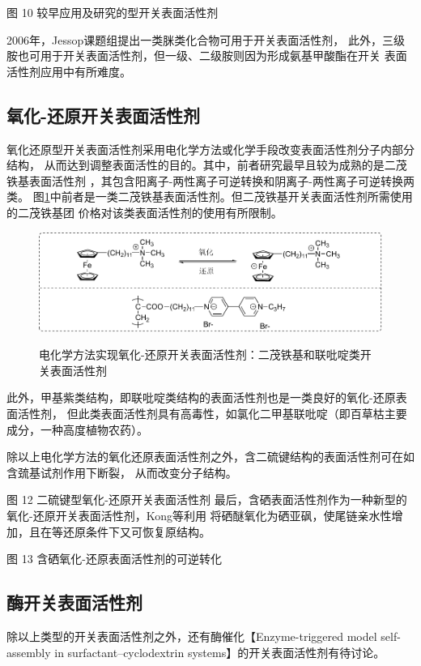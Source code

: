 \documentclass[bachelor,fandolfonts,replaceperiod]{jnuthesis} %
\begin{document}
    图 10 较早应用及研究的型开关表面活性剂
    
    2006年，Jessop课题组\cite{liu2006science}提出一类脒类化合物可用于开关表面活性剂，
    此外，三级胺也可用于开关表面活性剂，但一级、二级胺则因为形成氨基甲酸酯在开关
    表面活性剂应用中有所难度\cite{jessop2012}。
    \subsection{氧化-还原开关表面活性剂}
    氧化还原型开关表面活性剂采用电化学方法或化学手段改变表面活性剂分子内部分结构，
    从而达到调整表面活性的目的。其中，前者研究最早且较为成熟的是二茂铁基表面活性剂
    ，其包含阳离子-两性离子可逆转换和阴离子-两性离子可逆转换两类\cite{李云霞2011}。
    图\ref{fig:switchable-redox-cp2fe}中前者是一类二茂铁基表面活性剂。但二茂铁基开关表面活性剂所需使用的二茂铁基团
    价格对该类表面活性剂的使用有所限制。
    
    \begin{figure}[htbp]
        \centering
        \includegraphics[width= \textwidth]{Figure/switchable-cp2fe.pdf}\\
        \caption{电化学方法实现氧化-还原开关表面活性剂：二茂铁基和联吡啶类开关表面活性剂}\label{fig:switchable-redox-cp2fe}
    \end{figure}
    
    此外，甲基紫类结构，即联吡啶类结构的表面活性剂也是一类良好的氧化-还原表面活性剂，
    但此类表面活性剂具有高毒性，如氯化二甲基联吡啶（即百草枯主要成分，一种高度植物农药）。
    
    除以上电化学方法的氧化还原表面活性剂之外，含二硫键结构的表面活性剂可在如含巯基试剂作用下断裂，
    从而改变分子结构。
    
    图 12 二硫键型氧化-还原开关表面活性剂
    最后，含硒表面活性剂作为一种新型的氧化-还原开关表面活性剂，Kong等\cite{kong2016redox}利用
    将硒醚氧化为硒亚砜，使尾链亲水性增加，且在等还原条件下又可恢复原结构。
    
    图 13 含硒氧化-还原表面活性剂的可逆转化\cite{kong2016redox}
    
    \subsection{酶开关表面活性剂}
    除以上类型的开关表面活性剂之外，还有酶催化\cite{ku2011}【Enzyme-triggered model self-assembly in surfactant–cyclodextrin systems】的开关表面活性剂有待讨论。
    
\end{document}
